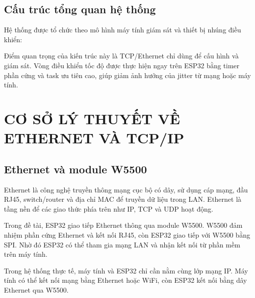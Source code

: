 \documentclass[12pt,a4paper]{report}
\begin{document}
\section{Cấu trúc tổng quan hệ thống}

Hệ thống được tổ chức theo mô hình máy tính giám sát và thiết bị nhúng điều khiển:

\begin{center}
\end{center}

Điểm quan trọng của kiến trúc này là TCP/Ethernet chỉ dùng để cấu hình và giám sát. Vòng điều khiển tốc độ được thực hiện ngay trên ESP32 bằng timer phần cứng và task ưu tiên cao, giúp giảm ảnh hưởng của jitter từ mạng hoặc máy tính.

\chapter{CƠ SỞ LÝ THUYẾT VỀ ETHERNET VÀ TCP/IP}

\section{Ethernet và module W5500}

Ethernet là công nghệ truyền thông mạng cục bộ có dây, sử dụng cáp mạng, đầu RJ45, switch/router và địa chỉ MAC để truyền dữ liệu trong LAN. Ethernet là tầng nền để các giao thức phía trên như IP, TCP và UDP hoạt động.

Trong đề tài, ESP32 giao tiếp Ethernet thông qua module W5500. W5500 đảm nhiệm phần cứng Ethernet và kết nối RJ45, còn ESP32 giao tiếp với W5500 bằng SPI. Nhờ đó ESP32 có thể tham gia mạng LAN và nhận kết nối từ phần mềm trên máy tính.

Trong hệ thống thực tế, máy tính và ESP32 chỉ cần nằm cùng lớp mạng IP. Máy tính có thể kết nối mạng bằng Ethernet hoặc WiFi, còn ESP32 kết nối bằng dây Ethernet qua W5500.
\end{document}
